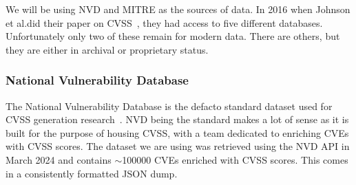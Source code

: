We will be using NVD and MITRE as the sources of data. In 2016 when Johnson et al.\@ did their paper
on CVSS~\cite{bayes}, they had access to five different databases. Unfortunately only two of these
remain for modern data. There are others, but they are either in archival or proprietary status.

\subsubsection{National Vulnerability Database} \label{NVD_SECTION}

The National Vulnerability Database is the defacto standard dataset used for CVSS generation
research~\cite{costa, nvd_example1, nvd_example2}.  NVD being the standard makes a lot of sense as
it is built for the purpose of housing CVSS, with a team dedicated to enriching CVEs with CVSS scores. The dataset we are using was retrieved using the NVD API in March 2024 and contains $\sim$100000 CVEs enriched with CVSS scores. This comes in a consistently formatted JSON dump.





